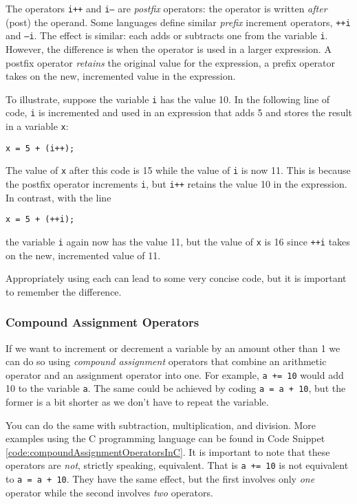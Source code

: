 The operators \texttt{i++} and \texttt{i--} are \emph{postfix} 
operators: the operator is written \emph{after} (post) the operand.  Some languages
define similar \emph{prefix} increment operators, \texttt{++i} and \texttt{--i}.
The effect is similar: each adds or subtracts one from the variable \texttt{i}.
However, the difference is when the operator is used in a larger expression.  A
postfix operator \emph{retains} the original value for the expression, a prefix
operator takes on the new, incremented value in the expression.  

To illustrate, suppose the variable \texttt{i} has the value 10.
In the following line of code, \texttt{i} is incremented and used
in an expression that adds 5 and stores the result in a variable \texttt{x}:

\texttt{x = 5 + (i++);}

The value of \texttt{x} after this code is 15 while the value of \texttt{i}
is now 11.  This is because the postfix operator increments \texttt{i}, but 
\texttt{i++} retains the value 10 in the expression.  In contrast, with the
line

\texttt{x = 5 + (++i);}

the variable \texttt{i} again now has the value 11, but the value of \texttt{x}
is 16 since \texttt{++i} takes on the new, incremented value of 11.  

Appropriately using each can lead to some very concise code, but it is important
to remember the difference.

\subsubsection{Compound Assignment Operators}

If we want to increment or decrement a variable by an amount other than 1
we can do so using \emph{compound assignment} operators that combine
an arithmetic operator and an assignment operator into one.  For example, 
\texttt{a += 10} would add 10 to the variable \texttt{a}.  The
same could be achieved by coding \texttt{a = a + 10}, but the former
is a bit shorter as we don't have to repeat the variable.  

You can do the same with subtraction, multiplication, and division.  More examples
using the C programming language can be found in Code Snippet 
\ref{code:compoundAssignmentOperatorsInC}.  It is important to
note that these operators are \emph{not}, strictly speaking, equivalent.  That is
\texttt{a += 10} is not equivalent to \texttt{a = a + 10}.  They have
the same effect, but the first involves only \emph{one} operator while the second
involves \emph{two} operators.

